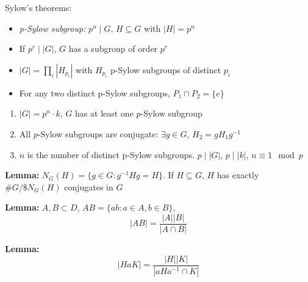 \documentclass[11pt]{article}
\newcommand{\abs}[1]{\left\vert #1 \right\vert}
\begin{document}
\begin{multicols}{2}
        Sylow's theorems:
        \begin{itemize}
            \item \emph{p-Sylow subgroup:} $p^n \mid G$, $H \subseteq G$ with $\abs{H} = p^n$
            \item If $p^r \mid \abs{G}$, $G$ has a subgroup of order $p^r$
            \item $\abs{G} = \prod_i \abs{H_{p_i}}$ with $H_{p_i}$ p-Sylow subgroups of distinct $p_i$
            \item For any two distinct p-Sylow subgroups, $P_1 \cap P_2 = \{e\}$
        \end{itemize}
        \begin{enumerate}
            \item $\abs{G} = p^n\cdot k$, $G$ has at least one $p$-Sylow subgroup
            \item All $p$-Sylow subgroups are conjugate: $\exists g \in G$, $H_2 = gH_1g^{-1}$
            \item $n$ is the number of distinct p-Sylow subgroups. $p \mid \abs{G}$, $p \mid \abs{k}$, $n \equiv 1 \mod p$
        \end{enumerate}

        \textbf{Lemma:} $N_G(H) = \{g\in G: g^{-1}Hg = H\}$. If $H \subseteq G$, $H$ has exactly $\#G/\$N_G(H)$ conjugates in $G$ 

        \textbf{Lemma:} $A, B \subset D$, $AB = \{ab: a \in A, b \in B\}$, 
        \[\abs{AB} = \frac{\abs{A}\abs{B}}{\abs{A \cap B}}\]

        \textbf{Lemma:} 
        \[\abs{HaK} = \frac{\abs{H}\abs{K}}{\abs{aHa^{-1} \cap K}}\]

\end{multicols}
\end{document}
